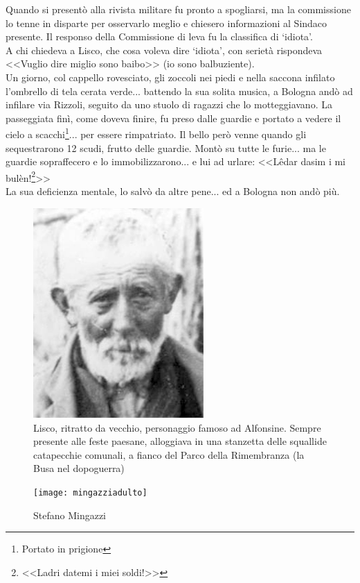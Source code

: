 \indent Quando si presentò alla rivista militare fu pronto a spogliarsi, ma la commissione lo tenne in disparte per osservarlo meglio e chiesero informazioni al Sindaco presente. Il responso della Commissione di leva fu la classifica di `idiota'.\\
\indent A chi chiedeva a Lisco, che cosa voleva dire `idiota', con serietà rispondeva <<Vuglio dire miglio sono baibo>> (io sono balbuziente).\\
\indent Un giorno, col cappello rovesciato, gli zoccoli nei piedi e nella saccona infilato l'ombrello di tela cerata verde... battendo la sua solita musica, a Bologna andò ad infilare via Rizzoli, seguito da uno stuolo di ragazzi che lo motteggiavano. La passeggiata finì, come doveva finire, fu preso dalle guardie e portato a vedere il cielo a scacchi\footnote{Portato in prigione}... per essere rimpatriato. Il bello però venne quando gli sequestrarono 12 scudi, frutto delle guardie. Montò su tutte le furie... ma le guardie sopraffecero e lo immobilizzarono... e lui ad urlare: <<Lêdar dasim i mi bulèn!\footnote{<<Ladri datemi i miei soldi!>>}>>\\
\indent La sua deficienza mentale, lo salvò da altre pene... ed a Bologna non andò più.\\

 \begin{figure}[htb]
    \centering
    \includegraphics[height=8cm]{Lisco}
    \caption[Lisco]{Lisco, ritratto da vecchio, personaggio famoso ad Alfonsine. Sempre presente alle feste paesane, alloggiava in una stanzetta delle squallide catapecchie comunali, a fianco del Parco della Rimembranza (la Busa nel dopoguerra)\label{fig:Lisco}}
\end{figure}

\newpage

 \begin{figure}[htb]
    \centering
    \texttt{[image: mingazziadulto]}
    \caption[Stefano Mingazzi]{Stefano Mingazzi\label{fig:mingazziadulto}}
\end{figure}


